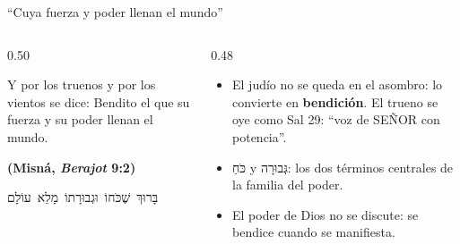 \documentclass[hyperref={bookmarks=false},aspectratio=169]{beamer}
\newcommand{\heb}[1]{\mbox{\foreignlanguage{hebrew}{#1}}}
\newcommand{\SENOR}{S{\fontsize{0.78em}{1em}\selectfont EÑOR}}
\newcommand{\fuente}[1]{\par\hfill{\upshape\bfseries\footnotesize\textcolor{azul}{#1}}}
\newcommand{\destacar}[1]{\textbf{\textcolor{azul}{#1}}}
\begin{document}
\begin{frame}{``Cuya fuerza y poder llenan el mundo''}
\begin{columns}[c,onlytextwidth]
\begin{column}{0.50\textwidth}
\begin{cita}[colback=dorado!10!papiro,colframe=dorado!80!azul]Y por los truenos y por los vientos se dice: Bendito el que su fuerza y su poder llenan el mundo.\fuente{(Misná, \emph{Berajot} 9:2)}\end{cita}
\begin{center}\scriptsize\heb{בָּרוּךְ שֶׁכֹּחוֹ וּגְבוּרָתוֹ מָלֵא עוֹלָם}\end{center}
\end{column}
\begin{column}{0.48\textwidth}\small
\begin{itemize}
\item El judío no se queda en el asombro: lo convierte en \destacar{bendición}. El trueno se oye como Sal 29: ``voz de \SENOR{} con potencia''.
\item \heb{כֹּחַ} y \heb{גְּבוּרָה}: los dos términos centrales de la familia del poder.
\item El poder de Dios no se discute: se bendice cuando se manifiesta.
\end{itemize}
\end{column}
\end{columns}
\end{frame}
\end{document}
